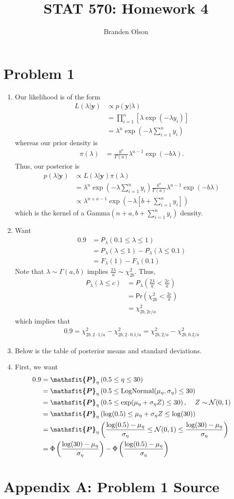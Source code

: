 \documentclass[11pt]{article}
\newcommand{\tens}[1]{\bm{\mathsfit{#1}}}
\newcommand*\htab{\hspace{4 mm}}
\newcommand*\ba{\[ \begin{aligned}}
\newcommand*\ea{\end{aligned} \]}
\newcommand*\enum{\begin{enumerate}[label=(\alph*)]}
\newcommand*\enumend{\end{enumerate}}
\newcommand*\by{\mathbf{y}}
\newcommand\Psub[2]{\tens{P}_{#1}\left(#2\right)}
\renewcommand\;{\,}
\renewcommand\Pr[1]{ \mathsf{Pr}\left(#1\right) }
\begin{document}
\title{STAT 570: Homework 4}
\author{Branden Olson}
\date{}
\maketitle

\section*{Problem 1}
\enum
\item
Our likelihood is of the form
\ba
L(\lambda| \by) & \propto p(\by| \lambda) \\
	& = \prod_{i=1}^n \left[\lambda \exp\left(-\lambda y_i\right)\right] \\
	& = \lambda^n \exp\left(-\lambda \sum_{i=1}^n y_i \right)
\ea
whereas our prior density is
\ba
\pi(\lambda) & = \frac{b^a}{\Gamma(a)} \lambda^{a - 1} \exp\left(-b \lambda\right).
\ea
Thus, our posterior is
\ba
p(\lambda | \by) & \propto L(\lambda | \by) \pi(\lambda) \\
	& = \lambda^n \exp\left(-\lambda \sum_{i=1}^n y_i \right)
		\frac{b^a}{\Gamma(a)} \lambda^{a - 1} \exp\left(-b \lambda\right) \\
	& \propto \lambda^{n + a - 1} 
		\exp\left(-\lambda\left[ b + \sum_{i=1}^n y_i \right] \right)
\ea
which is the kernel of a Gamma$\left(n + a, b + \sum_{i=1}^n y_i\right)$ density.
\item
Want
\ba
0.9 & = \Psub{\lambda}{ 0.1 \le \lambda \le 1} \\
	& = \Psub{\lambda}{ \lambda \le 1 } - \Psub{\lambda}{\lambda \le 0.1} \\
	& = F_\lambda(1) - F_\lambda(0.1)
\ea 
Note that $\lambda \sim \Gamma(a, b)$ implies
$\frac{2\lambda}{a} \sim \chi_{2b}^2$. Thus,
\ba
\Psub{\lambda}{\lambda \le c} & 
	= \Psub{\lambda}{ \frac{2\lambda}{a} < \frac{2c}{a} } \\
	& = \Pr{ \chi_{2b}^2 < \frac{2c}{a} } \\
	& = \chi_{2b, 2c/a}^2
\ea
which implies that
\ba
0.9 = \chi_{2b, 2\cdot 1/a}^2 - \chi_{2b, 2\cdot 0.1/a}^2
	= \chi_{2b, 2/a}^2 - \chi_{2b, 0.2/a}^2
\ea
\item
Below is the table of posterior means and standard deviations.


\item
First, we want
\ba
0.9 & = \Psub{\eta}{ 0.5 \le \eta \le 30 }  \\
	& = \Psub{\eta}{ 0.5 \le \text{LogNormal}(\mu_\eta, \sigma_\eta) \le 30 } \\
	& = \Psub{\eta}{ 0.5 \le \exp(\mu_\eta + \sigma_\eta Z) \le 30 },
		\htab Z \sim \mathcal{N}(0, 1) \\
	& = \Psub{\eta}{ \log(0.5) \le \mu_\eta + \sigma_\eta Z \le \log(30) } \\
	& = \Psub{\eta}{ \frac{\log(0.5) - \mu_\eta}{\sigma_\eta}
			\le \mathcal{N}(0, 1) \le
			\frac{\log(30) - \mu_\eta}{\sigma_\eta} } \\
	& = \Phi\left( \frac{\log(30) - \mu_\eta}{\sigma_\eta} \right)
		- \Phi\left( \frac{\log(0.5) - \mu_\eta}{\sigma_\eta} \right)
\ea



\enumend
 
\newpage
\section*{Appendix A: Problem 1 Source}

\end{document}
